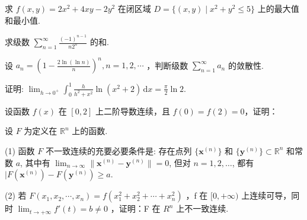 \par{}
求 $f(x, y) = 2x^{2} + 4xy - 2y^{2}$ 在闭区域 $D = \{(x, y) \mid x^{2} + y^{2} \leq 5\}$ 上的最大值和最小值.\par
\par{}
求级数 $\sum_{n=1}^{\infty} \frac{(-1)^{n-1}}{n2^n}$ 的和.\par
\par{}
设  $a_{n}=\left(1-\frac{2\ln(\ln n)}{n}\right)^{n}, n=1,2,\cdots$ ，判断级数  $\sum_{n=1}^{\infty}a_{n}$  的敛散性.\par
\par{}
证明: $\lim_{h \to 0^{+}} \int_{0}^{1} \frac{h}{h^{2} + x^{2}} \ln (x^{2} + 2) \, \mathrm{d}x = \frac{\pi}{2} \ln 2.$\par
\par{}
\par{}
设函数 $f(x)$ 在 $[0,2]$ 上二阶导数连续，且 $f(0) = f(2) = 0$，证明：\par
\nopagebreak[4]
\par{}
设 $F$ 为定义在 $\mathbb{R}^n$ 上的函数.\par
(1) 函数 $F$ 不一致连续的充要必要条件是: 存在点列 $\{\pmb{x}^{(n)}\}$ 和 $\{\pmb{y}^{(n)}\} \subset \mathbb{R}^n$ 和常数 $a$, 其中有 $\lim_{n \to \infty} \| \pmb{x}^{(n)} - \pmb{y}^{(n)} \| = 0$, 但对 $n = 1, 2, \dots$, 都有 $|F(\pmb{x}^{(n)}) - F(\pmb{y}^{(n)}) \geq a$.\par
(2) 若  $F(x_{1}, x_{2}, \cdots, x_{n}) = f(x_{1}^{2} + x_{2}^{2} + \cdots + x_{n}^{2})$ ，f 在  $[0, +\infty)$  上连续可导，同时  $\lim_{t \to +\infty} f'(t) = b \neq 0$ ，证明：F 在  $R^{n}$  上不一致连续.\par
